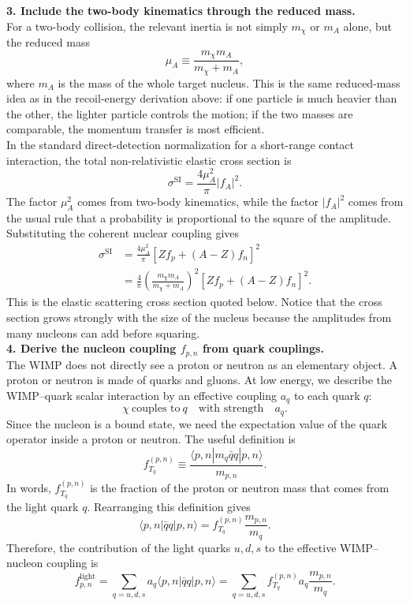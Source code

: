 \begin{foundation}
    \textbf{3. Include the two-body kinematics through the reduced mass.}\\
    For a two-body collision, the relevant inertia is not simply $m_\chi$ or $m_A$ alone, but the reduced mass
    \[
        \mu_A \equiv \frac{m_\chi m_A}{m_\chi+m_A},
    \]
    where $m_A$ is the mass of the whole target nucleus. This is the same reduced-mass idea as in the recoil-energy derivation above: if one particle is much heavier than the other, the lighter particle controls the motion; if the two masses are comparable, the momentum transfer is most efficient. \\

    In the standard direct-detection normalization for a short-range contact interaction, the total non-relativistic elastic cross section is
    \[
        \sigma^{\mathrm{SI}} = \frac{4\mu_A^2}{\pi}|f_A|^2 .
    \]
    The factor $\mu_A^2$ comes from two-body kinematics, while the factor $|f_A|^2$ comes from the usual rule that a probability is proportional to the square of the amplitude. Substituting the coherent nuclear coupling gives
    \begin{align*}
        \sigma^{\mathrm{SI}}
        &= \frac{4\mu_A^2}{\pi}\left[ Z f_p + (A-Z) f_n \right]^2 \\
        &= \frac{4}{\pi}\left(\frac{m_\chi m_A}{m_\chi+m_A}\right)^2
        \left[ Z f_p + (A-Z) f_n \right]^2 .
    \end{align*}
    This is the elastic scattering cross section quoted below. Notice that the cross section grows strongly with the size of the nucleus because the amplitudes from many nucleons can add before squaring. \\

    \textbf{4. Derive the nucleon coupling $f_{p,n}$ from quark couplings.}\\
    The WIMP does not directly see a proton or neutron as an elementary object. A proton or neutron is made of quarks and gluons. At low energy, we describe the WIMP--quark scalar interaction by an effective coupling $a_q$ to each quark $q$:
    \[
        \chi \ \text{couples to} \ q \quad \text{with strength} \quad a_q .
    \]
    Since the nucleon is a bound state, we need the expectation value of the quark operator inside a proton or neutron. The useful definition is
    \[
        f_{T_q}^{(p,n)} \equiv \frac{\langle p,n|m_q \bar{q}q|p,n\rangle}{m_{p,n}} .
    \]
    In words, $f_{T_q}^{(p,n)}$ is the fraction of the proton or neutron mass that comes from the light quark $q$. Rearranging this definition gives
    \[
        \langle p,n|\bar{q}q|p,n\rangle
        = f_{T_q}^{(p,n)}\frac{m_{p,n}}{m_q} .
    \]
    Therefore, the contribution of the light quarks $u,d,s$ to the effective WIMP--nucleon coupling is
    \[
        f_{p,n}^{\mathrm{light}}
        = \sum_{q=u,d,s} a_q \langle p,n|\bar{q}q|p,n\rangle
        = \sum_{q=u,d,s} f_{T_q}^{(p,n)} a_q \frac{m_{p,n}}{m_q} .
    \]


\end{foundation}
